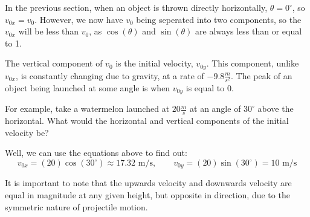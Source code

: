 In the previous section, when an object is thrown directly horizontally, $\theta = 0 ^\circ$, so $v_{0x} = v_0$. However, we now have $v_{0}$ being seperated into two components, so the $v_{0x}$ will be less than $v_0$, as $\cos(\theta)$ and $\sin(\theta)$ are always less than or equal to 1.

The vertical component of $v_0$ is the initial velocity, $v_{0y}$. This component, unlike $v_{0x}$, is constantly changing due to gravity, at a rate of $-9.8 \frac{m}{s^2}$. The peak of an object being launched at some angle is when $v_{0y}$ is equal to 0. 


\begin{center}
\end{center}

For example, take a watermelon launched at $20 \frac{m}{s}$ at an angle of $30^\circ$ above the horizontal. What would the horizontal and vertical components of the initial velocity be?

Well, we can use the equations above to find out:
$$
v_{0x} = (20) \cos(30^\circ) \approx 17.32 \text{ m/s}, \qquad v_{0y} = (20) \sin(30^\circ) = 10 \text{ m/s}
$$

It is important to note that the upwards velocity and downwards velocity are equal in magnitude at any given height, but opposite in direction, due to the symmetric nature of projectile motion.


